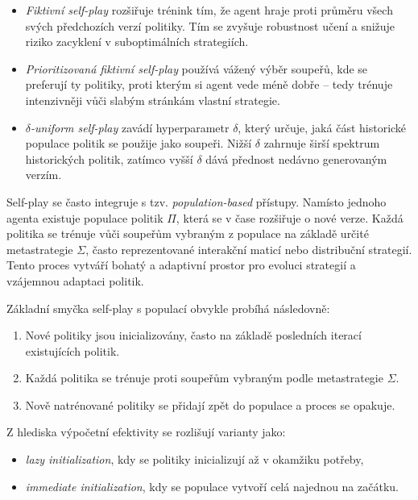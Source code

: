 \begin{itemize}
    \item \textit{Fiktivní self-play} rozšiřuje trénink tím, že agent hraje proti průměru všech svých 
    předchozích verzí politiky. Tím se zvyšuje robustnost učení a snižuje riziko zacyklení v suboptimálních strategiích.
    \item \textit{Prioritizovaná fiktivní self-play} používá vážený výběr soupeřů, kde se preferují ty 
    politiky, proti kterým si agent vede méně dobře – tedy trénuje intenzivněji vůči slabým stránkám vlastní strategie.
    \item \textit{$\delta$-uniform self-play} zavádí hyperparametr $\delta$, který určuje, jaká část 
    historické populace politik se použije jako soupeři. Nižší $\delta$ zahrnuje širší spektrum historických politik, 
    zatímco vyšší $\delta$ dává přednost nedávno generovaným verzím.
\end{itemize}

Self-play se často integruje s tzv. \textit{population-based} přístupy. Namísto jednoho agenta existuje populace 
politik $\Pi$, která se v čase rozšiřuje o nové verze. Každá politika se trénuje vůči soupeřům vybraným z populace 
na základě určité metastrategie $\Sigma$, často reprezentované interakční maticí nebo distribuční strategií. Tento 
proces vytváří bohatý a adaptivní prostor pro evoluci strategií a vzájemnou adaptaci politik.

Základní smyčka self-play s populací obvykle probíhá následovně:

\begin{enumerate}
    \item Nové politiky jsou inicializovány, často na základě posledních iterací existujících politik.
    \item Každá politika se trénuje proti soupeřům vybraným podle metastrategie $\Sigma$.
    \item Nově natrénované politiky se přidají zpět do populace a proces se opakuje.
\end{enumerate}

Z hlediska výpočetní efektivity se rozlišují varianty jako:

\begin{itemize}
    \item \textit{lazy initialization}, kdy se politiky inicializují až v okamžiku potřeby,
    \item \textit{immediate initialization}, kdy se populace vytvoří celá najednou na začátku.
\end{itemize}

